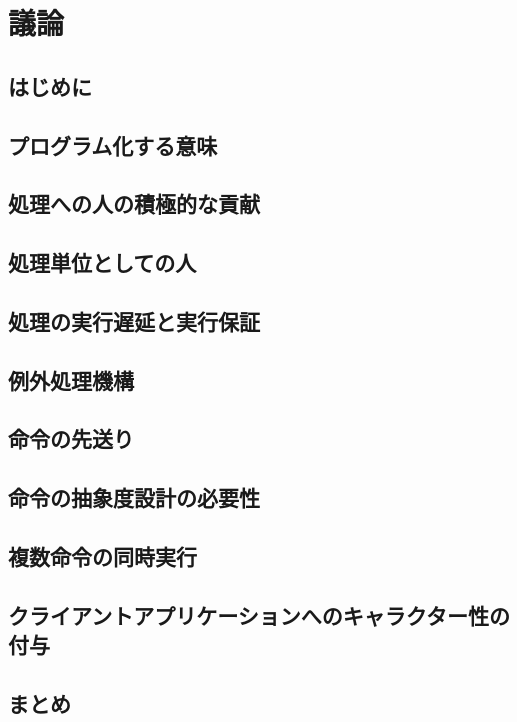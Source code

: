 \chapter{議論}
\label{chap:discussion}

\section{はじめに}

\section{プログラム化する意味}
\section{処理への人の積極的な貢献}
\section{処理単位としての人}
\section{処理の実行遅延と実行保証}
\section{例外処理機構}
\section{命令の先送り}
\section{命令の抽象度設計の必要性}
\section{複数命令の同時実行}
\section{クライアントアプリケーションへのキャラクター性の付与}
\section{まとめ}

